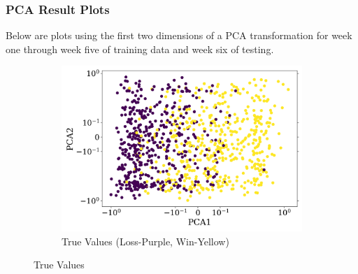 \documentclass{article}
\begin{document}
\subsubsection{PCA Result Plots} \label{pca_results}
\par
Below are plots using the first two dimensions of a PCA transformation for week one through week five of training data and week six of testing.

\begin{figure}[H]
    \centering
    \begin{subfigure}[t]{0.495\textwidth}
        \centering
        \includegraphics[width=\textwidth]{results/GaussianNB_True_Values_Week_6_With_RS_True.png}
        \caption{True Values (Loss-Purple, Win-Yellow)}
        \label{fig:true_values_sub}
    \end{subfigure}
    \caption{True Values}
    \label{fig:true_values}
\end{figure}
\end{document}
